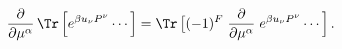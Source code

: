 \begin{equation}
   \frac{\partial }{ \partial \mu^\alpha} \,
   \Tr \left[ e^{\beta u_\nu P^\nu} \cdots \right]
   =
   \Tr \left[ (-1)^F \right.
       \frac{\partial }{ \partial \mu^\alpha} \left. e^{\beta u_\nu P^\nu} \cdots
   \right] .
\end{equation}


